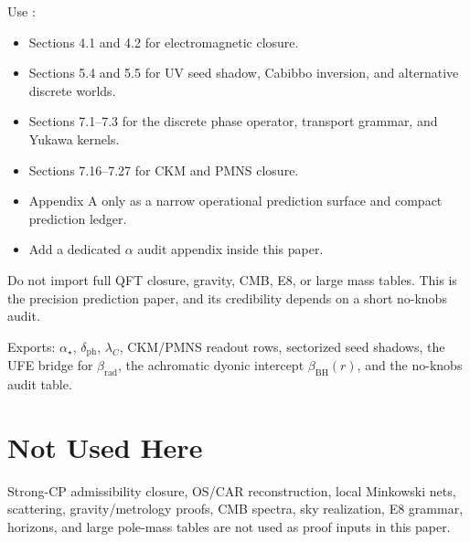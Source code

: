 \begin{tfptsourcebox}
Use \sourceDraft:
\begin{itemize}[leftmargin=1.5em]
    \item Sections 4.1 and 4.2 for electromagnetic closure.
    \item Sections 5.4 and 5.5 for UV seed shadow, Cabibbo inversion, and alternative discrete
    worlds.
    \item Sections 7.1--7.3 for the discrete phase operator, transport grammar, and Yukawa kernels.
    \item Sections 7.16--7.27 for CKM and PMNS closure.
    \item Appendix A only as a narrow operational prediction surface and compact prediction ledger.
    \item Add a dedicated $\alpha$ audit appendix inside this paper.
\end{itemize}
\end{tfptsourcebox}

\begin{tfptwarningbox}
Do not import full QFT closure, gravity, CMB, E8, or large mass tables. This is the precision
prediction paper, and its credibility depends on a short no-knobs audit.
\end{tfptwarningbox}


\begin{tfptexports}
Exports: $\alpha_\star$, $\delta_{\mathrm{ph}}$, $\lambda_C$, CKM/PMNS readout rows, sectorized seed shadows, the UFE bridge for $\beta_{\mathrm{rad}}$, the achromatic dyonic intercept $\beta_{\mathrm{BH}}(r)$, and the no-knobs audit table.
\end{tfptexports}

\section{Not Used Here}

Strong-CP admissibility closure, OS/CAR reconstruction, local Minkowski nets, scattering,
gravity/metrology proofs, CMB spectra, sky realization, E8 grammar, horizons, and large pole-mass
tables are not used as proof inputs in this paper.

\clearpage



